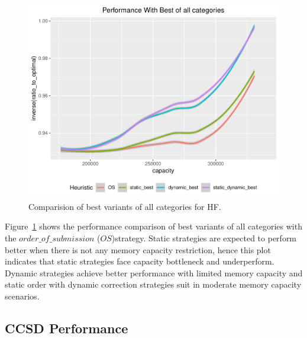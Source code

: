 \documentclass[sigconf]{acmart}
\begin{document}
{		
		\begin{figure}[htb]
			\includegraphics[scale=0.5]{./results/plots/inverse_ratio_to_optimal_hf-best.pdf}
			\caption{Comparision of best variants of all categories for HF.}
			\label{fig:ratio_to_optimal_best_hf}
		\end{figure}
		
		
		Figure~\ref{fig:ratio_to_optimal_best_hf} shows the performance comparison of best variants of all categories with the $order\_of\_submission$ ($OS$)strategy. Static strategies are expected to perform better when there is not any memory capacity restriction, hence this plot indicates that static strategies face capacity bottleneck and underperform. Dynamic strategies achieve better performance with limited memory capacity and static order with dynamic correction strategies suit in moderate memory capacity scenarios.
		
		\subsection{CCSD Performance}
		
		
}
\end{document}
